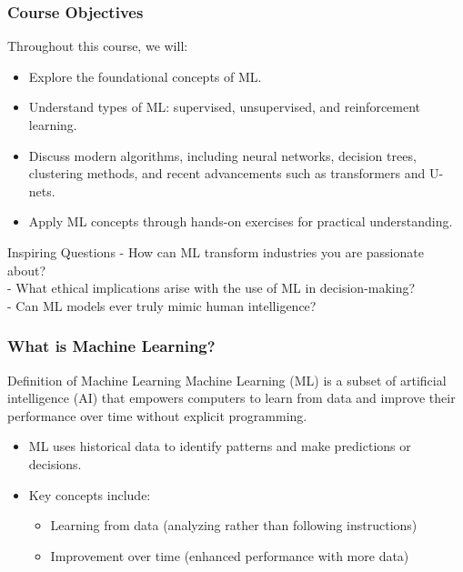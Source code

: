 \documentclass[aspectratio=169]{beamer}
\begin{document}
\begin{frame}[fragile]
    \frametitle{Course Objectives}

    Throughout this course, we will:
    \begin{itemize}
        \item Explore the foundational concepts of ML.
        \item Understand types of ML: supervised, unsupervised, and reinforcement learning.
        \item Discuss modern algorithms, including neural networks, decision trees, clustering methods, and recent advancements such as transformers and U-nets.
        \item Apply ML concepts through hands-on exercises for practical understanding.
    \end{itemize}
    
    \begin{block}{Inspiring Questions}
    - How can ML transform industries you are passionate about? \\
    - What ethical implications arise with the use of ML in decision-making? \\
    - Can ML models ever truly mimic human intelligence?
    \end{block}
\end{frame}

\begin{frame}[fragile]
    \frametitle{What is Machine Learning?}
    \begin{block}{Definition of Machine Learning}
        Machine Learning (ML) is a subset of artificial intelligence (AI) that empowers computers 
        to learn from data and improve their performance over time without explicit programming. 
    \end{block}
    \begin{itemize}
        \item ML uses historical data to identify patterns and make predictions or decisions.
        \item Key concepts include:
        \begin{itemize}
            \item Learning from data (analyzing rather than following instructions)
            \item Improvement over time (enhanced performance with more data)
        \end{itemize}
    \end{itemize}
\end{frame}
\end{document}
